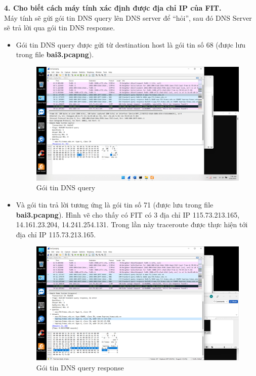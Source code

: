 \textbf{4.	Cho biết cách máy tính xác định được địa chỉ IP của FIT.}\\
Máy tính sẽ gửi gói tin DNS query lên DNS server để “hỏi”, sau đó DNS Server sẽ trả lời qua gói tin DNS response. 
\begin{itemize}
\item Gói tin DNS query được gửi từ destination host là gói tin số 68 (được lưu trong file \textbf{bai3.pcapng}).
\begin{figure}[H]
\begin{center}
\includegraphics[scale=1]{../figures/p3/p3_dns1}
\end{center}
\caption{Gói tin DNS query}
\end{figure}
\item Và gói tin trả lời tương ứng là gói tin số 71 (được lưu trong file \textbf{bai3.pcapng}). Hình vẽ cho thấy có FIT có 3 địa chỉ IP 115.73.213.165, 14.161.23.204, 14.241.254.131. Trong lần này traceroute được thực hiện tới địa chỉ IP 115.73.213.165. 
\begin{figure}[H]
\begin{center}
\includegraphics[scale=1]{../figures/p3/p3_dns2}
\end{center}
\caption{Gói tin DNS query response}
\end{figure}
\end{itemize}
